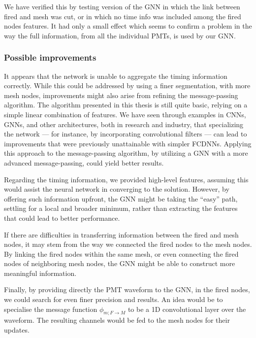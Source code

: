 \documentclass[../main.tex]{subfiles}
\begin{document}
We have verified this by testing version of the GNN in which the link between fired and mesh was cut, or in which no time info was included among the fired nodes features. It had only a small effect
which seems to confirm a problem in the way the full information, from all the individual PMTs, is used by our GNN.


\subsubsection{Possible improvements}


It appears that the network is unable to aggregate the timing information correctly. While this could be addressed by using a finer segmentation, with more mesh nodes, improvements might also arise from refining the message-passing algorithm. The algorithm presented in this thesis is still quite basic, relying on a simple linear combination of features. We have seen through examples in CNNs, GNNs, and other architectures, both in research and industry, that specializing the network — for instance, by incorporating convolutional filters — can lead to improvements that were previously unattainable with simpler FCDNNs. Applying this approach to the message-passing algorithm, by utilizing a GNN with a more advanced message-passing, could yield better results.


Regarding the timing information, we provided high-level features, assuming this would assist the neural network in converging to the solution. However, by offering such information upfront, the GNN might be taking the ``easy'' path, settling for a local and broader minimum, rather than extracting the features that could lead to better performance.

If there are difficulties in transferring information between the fired and mesh nodes, it may stem from the way we connected the fired nodes to the mesh nodes. By linking the fired nodes within the same mesh, or even connecting the fired nodes of neighboring mesh nodes, the GNN might be able to construct more meaningful information.

Finally, by providing directly the PMT waveform to the GNN, in the fired nodes, we could search for even finer precision and results. An idea would be to specialise the message function $\phi_{m;F \rightarrow M}$ to be a 1D convolutional layer over the waveform. The resulting channels would be fed to the mesh nodes for their updates.
\end{document}
